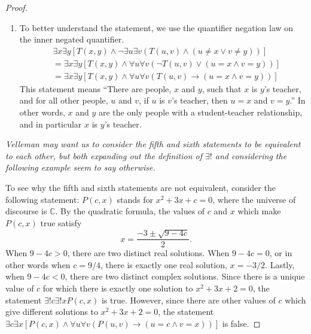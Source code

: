 \documentclass[12pt]{amsart}
\theoremstyle{definition}
\theoremstyle{remark}
\newcommand{\BC}{\mathbb C}
\begin{document}
\begin{proof}
\begin{enumerate}
	\item To better understand the statement, we use the quantifier negation law on the
	inner negated quantifier.
	\begin{align*}
		& \exists x \exists y 
			[T(x, y) \wedge \neg \exists u \exists v (T(u, v) \wedge (u \neq x \vee v \neq y))] \\
		&= \exists x \exists y
			[T(x, y) \wedge \forall u \forall v (\neg T(u, v) \vee (u = x \wedge v = y))] \\
		&= \exists x \exists y
			[T(x, y) \wedge \forall u \forall v (T(u, v) \rightarrow (u = x \wedge v = y))]
	\end{align*}
	This statement means ``There are people, $x$ and $y$, such that $x$ is $y$'s teacher, 
	and for all other people, $u$ and $v$, if $u$ is $v$'s teacher, then $u = x$ and $v = y$.''
	In other words, $x$ and $y$ are the only people with a student-teacher relationship,
	and in particular $x$ is $y$'s teacher.
\end{enumerate}
\emph{Velleman may want us to consider the fifth and sixth statements to be equivalent to each other, but both expanding out the definition of $\exists!$ and considering the following example seem to say otherwise.}

To see why the fifth and sixth statements are not equivalent,
consider the following statement: $P(c, x)$ stands for $x^2 + 3x + c = 0$,
where the universe of discourse is $\BC$.
By the quadratic formula, the values of $c$ and $x$ which make $P(c, x)$ true satisfy
\begin{equation*}
	x = \frac{-3 \pm \sqrt{9 - 4c}}{2}.
\end{equation*}
When $9 - 4c > 0$, there are two distinct real solutions.
When $9 - 4c = 0$, or in other words when $c = 9/4$, there is exactly one real solution, $x = -3/2$.
Lastly, when $9 - 4c < 0$, there are two distinct complex solutions.
Since there is a unique value of $c$ for which there is exactly one solution to $x^2 + 3x + 2 = 0$,
the statement $\exists! c \exists! x P(c, x)$ is true.
However, since there are other values of $c$ which give different solutions to $x^2 + 3x + 2 = 0$,
the statement 
$\exists c \exists x [P(c, x) \wedge \forall u \forall v (P(u, v) \rightarrow (u = c \wedge v = x))]$
is false.
\end{proof}
\end{document}
